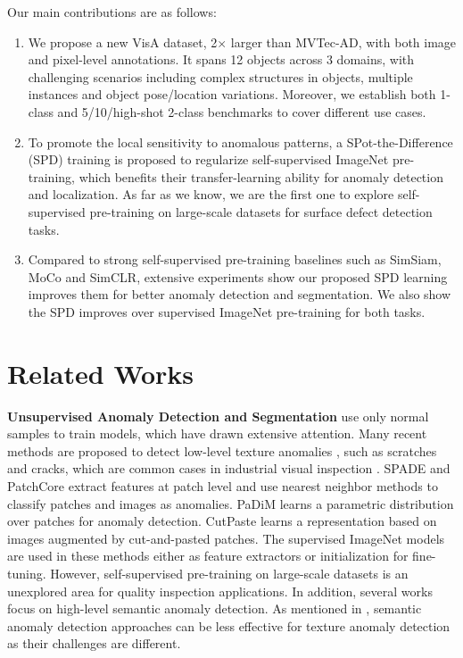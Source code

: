 Our main contributions are as follows:
\begin{enumerate}
    \item We propose a new VisA dataset, 2$\times$ larger than MVTec-AD, with both image and pixel-level annotations. It spans 12 objects across 3 domains, with challenging scenarios including complex structures in objects, multiple instances and object pose/location variations. Moreover, we establish both 1-class and 5/10/high-shot 2-class benchmarks to cover different use cases.
    \item To promote the local sensitivity to anomalous patterns, a SPot-the-Difference (SPD) training is proposed to regularize self-supervised ImageNet pre-training, which benefits their transfer-learning ability for anomaly detection and localization. As far as we know, we are the first one to explore self-supervised pre-training on large-scale datasets for surface defect detection tasks. 
    \item Compared to strong self-supervised pre-training baselines such as SimSiam, MoCo and SimCLR, extensive experiments show our proposed SPD learning improves them for better anomaly detection and segmentation. We also show the SPD improves over supervised ImageNet pre-training for both tasks. 
\end{enumerate}
\section{Related Works}
\noindent\textbf{Unsupervised Anomaly Detection and Segmentation} use only normal samples to train models, which have drawn extensive attention. Many recent methods are proposed to detect low-level texture anomalies \cite{ruff2021unifying}, such as scratches and cracks, which are common cases in industrial visual inspection \cite{Deng_2022_CVPR,Ristea-CVPR-2022,RudWeh2022,yi2020patch}. SPADE \cite{defard2021padim} and PatchCore \cite{Roth_2022_CVPR} extract features at patch level and use nearest neighbor methods to classify patches and images as anomalies. PaDiM \cite{defard2021padim} learns a parametric distribution over patches for anomaly detection. CutPaste \cite{li2021cutpaste} learns a representation based on images augmented by cut-and-pasted patches. The supervised ImageNet models are used in these methods either as feature extractors or initialization for fine-tuning. However, self-supervised pre-training on large-scale datasets is an unexplored area for quality inspection applications. In addition, several works \cite{reiss2021mean,sohn2021learning,tack2020csi,pmlr-v80-ruff18a} focus on high-level semantic anomaly detection. As mentioned in \cite{ruff2021unifying}, semantic anomaly detection approaches can be less effective for texture anomaly detection as their challenges are different.

